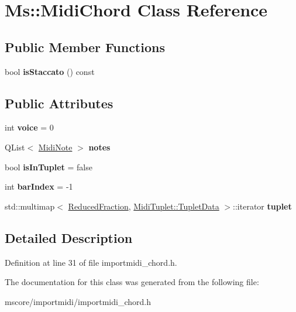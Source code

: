 \hypertarget{class_ms_1_1_midi_chord}{}\section{Ms\+:\+:Midi\+Chord Class Reference}
\label{class_ms_1_1_midi_chord}
\subsection*{Public Member Functions}
\begin{DoxyCompactItemize}
\item 
\mbox{\label{class_ms_1_1_midi_chord_a3c1d386a9a8b2d10dffa7ef2a2672687}} 
bool {\bfseries is\+Staccato} () const
\end{DoxyCompactItemize}
\subsection*{Public Attributes}
\begin{DoxyCompactItemize}
\item 
\mbox{\label{class_ms_1_1_midi_chord_af8772c2217a40b4e16cfe5403e11755f}} 
int {\bfseries voice} = 0
\item 
\mbox{\label{class_ms_1_1_midi_chord_ac44803fcf358dffffb2155abbe1c60f4}} 
Q\+List$<$ \hyperlink{class_ms_1_1_midi_note}{Midi\+Note} $>$ {\bfseries notes}
\item 
\mbox{\label{class_ms_1_1_midi_chord_a89fd518f511c14501a9338629155483f}} 
bool {\bfseries is\+In\+Tuplet} = false
\item 
\mbox{\label{class_ms_1_1_midi_chord_a3b660b97d5e7498e71bf33d4548f965d}} 
int {\bfseries bar\+Index} = -\/1
\item 
\mbox{\label{class_ms_1_1_midi_chord_a1b30b1289752208f9d22c04fff96785d}} 
std\+::multimap$<$ \hyperlink{class_ms_1_1_reduced_fraction}{Reduced\+Fraction}, \hyperlink{struct_ms_1_1_midi_tuplet_1_1_tuplet_data}{Midi\+Tuplet\+::\+Tuplet\+Data} $>$\+::iterator {\bfseries tuplet}
\end{DoxyCompactItemize}


\subsection{Detailed Description}


Definition at line 31 of file importmidi\+\_\+chord.\+h.



The documentation for this class was generated from the following file\+:\begin{DoxyCompactItemize}
\item 
mscore/importmidi/importmidi\+\_\+chord.\+h\end{DoxyCompactItemize}
